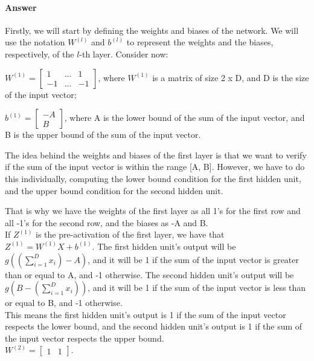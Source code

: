 \documentclass{article}
\begin{document}
\paragraph{Answer}

Firstly, we will start by defining the weights and biases of the network. We will use the notation
\( W^{(l)} \) and \( b^{(l)} \) to represent the weights and the biases, respectively, of the \( l \)-th layer. 
Consider now: 

\( W^{(1)} = \begin{bmatrix}
    1  & ... & 1  \\
    -1 & ... & -1
\end{bmatrix}
\), where \(W^{(1)}\) is a matrix of size 2 x D, and D is the size of the input vector; 

\(b^{(1)} = \begin{bmatrix}
    -A \\
    B
\end{bmatrix}
\), where A is the lower bound of the sum of the input vector, and B is the upper bound of the sum of the input vector. 

The idea behind the weights and biases of the first layer is that we want to verify if the sum of the input vector is within the range [A, B].
However, we have to do this individually, computing the lower bound condition for the first hidden unit, 
and the upper bound condition for the second hidden unit.

That is why we have the weights of the first layer as all 1's for the first row and all -1's for the second row, and the biases as -A and B. \\ 
If $Z^{(1)}$ is the pre-activation of the first layer, we have that $Z^{(1)} = W^{(1)}X + b^{(1)}$.
The first hidden unit's output will be $g((\sum_{i=1}^{D} x_i) - A)$, and it will be 1 if the sum of the input vector is greater than or equal to A, 
and -1 otherwise.
The second hidden unit's output will be $g(B - (\sum_{i=1}^{D} x_i))$, and it will be 1 if the sum of the input vector is less than or equal to B, 
and -1 otherwise. \\
This means the first hidden unit's output is 1 if the sum of the input vector respects the lower bound, 
and the second hidden unit's output is 1 if the sum of the input vector respects the upper bound. \\

\( W^{(2)} = \begin{bmatrix}
    1 & 1
\end{bmatrix}
\).
\end{document}
